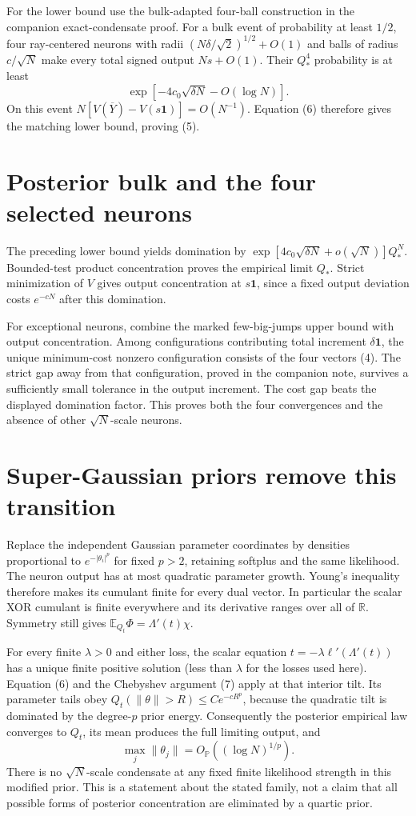 \documentclass[11pt]{article}
\newcommand{\E}{\mathbb E}\newcommand{\R}{\mathbb R}\newcommand{\one}{\mathbf 1}\newcommand{\Pp}{\mathbb P}
\begin{document}
For the lower bound use the bulk-adapted four-ball construction in
the companion exact-condensate proof. For a bulk event of probability
at least $1/2$, four ray-centered neurons with radii
$(N\delta/\sqrt2)^{1/2}+O(1)$ and balls of radius $c/\sqrt N$
make every total signed output $Ns+O(1)$. Their $Q_*^4$ probability
is at least
\[
 \exp[-4c_0\sqrt{\delta N}-O(\log N)].
\]
On this event $N[V(\overline Y)-V(s\one)]=O(N^{-1})$.
Equation (6) therefore gives the matching lower bound, proving (5).

\section{Posterior bulk and the four selected neurons}
The preceding lower bound yields domination by
$\exp[4c_0\sqrt{\delta N}+o(\sqrt N)]Q_*^N$.
Bounded-test product concentration proves the empirical limit $Q_*$.
Strict minimization of $V$ gives output concentration at $s\one$,
since a fixed output deviation costs $e^{-cN}$ after this domination.

For exceptional neurons, combine the marked few-big-jumps upper
bound with output concentration. Among configurations contributing
total increment $\delta\one$, the unique minimum-cost nonzero
configuration consists of the four vectors (4). The strict gap away
from that configuration, proved in the companion note, survives a
sufficiently small tolerance in the output increment. The cost gap
beats the displayed domination factor. This proves both the four
convergences and the absence of other $\sqrt N$-scale neurons.

\section{Super-Gaussian priors remove this transition}
Replace the independent Gaussian parameter coordinates by densities
proportional to $e^{-|\theta_i|^p}$ for fixed $p>2$, retaining softplus
and the same likelihood. The neuron output has at most quadratic
parameter growth. Young's inequality therefore makes its cumulant
finite for every dual vector. In particular the scalar XOR cumulant
is finite everywhere and its derivative ranges over all of $\R$.
Symmetry still gives $\E_{Q_t}\Phi=\Lambda'(t)\chi$.

For every finite $\lambda>0$ and either loss, the scalar equation
$t=-\lambda\ell'(\Lambda'(t))$ has a unique finite positive solution
(less than $\lambda$ for the losses used here). Equation (6) and the
Chebyshev argument (7) apply at that interior tilt. Its parameter
tails obey $Q_t(\|\theta\|>R)\le C e^{-cR^p}$, because the
quadratic tilt is dominated by the degree-$p$ prior energy.
Consequently the posterior empirical law converges to $Q_t$, its
mean produces the full limiting output, and
\[
 \max_j\|\theta_j\|=O_{\Pp}((\log N)^{1/p}).
\]
There is no $\sqrt N$-scale condensate at any fixed finite likelihood
strength in this modified prior. This is a statement about the stated
family, not a claim that all possible forms of posterior concentration
are eliminated by a quartic prior.
\end{document}
